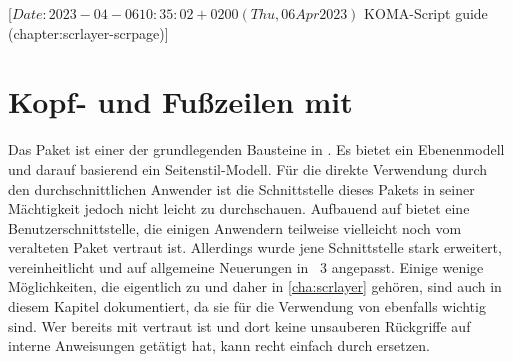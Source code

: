 %
%
%
%
%
%
%

%
                 [$Date: 2023-04-06 10:35:02 +0200 (Thu, 06 Apr 2023) $
                  KOMA-Script guide (chapter:scrlayer-scrpage)]

\chapter[{Kopf- und Fußzeilen mit \Package{scrlayer-scrpage}}]
  {Kopf- und Fußzeilen mit
    }
%
\BeginIndexGroup%
%
Das Paket \hyperref[cha:scrlayer]{}%
%
 ist einer der grundlegenden Bausteine in
\KOMAScript{}. Es bietet ein Ebenenmodell und darauf basierend ein
Seitenstil-Modell. Für die direkte Verwendung durch den durchschnittlichen
Anwender ist die Schnittstelle dieses Pakets in seiner Mächtigkeit jedoch
nicht leicht zu durchschauen.  Aufbauend auf
\hyperref[cha:scrlayer]{} bietet
 eine
Benutzerschnittstelle, die einigen Anwendern teilweise vielleicht noch vom
veralteten Paket
vertraut ist. Allerdings wurde jene Schnittstelle stark erweitert,
vereinheitlicht und auf allgemeine Neuerungen in \KOMAScript~3 angepasst.
Einige wenige Möglichkeiten, die eigentlich zu
\hyperref[cha:scrlayer]{} und daher in
\autoref{cha:scrlayer} gehören, sind auch in diesem Kapitel dokumentiert, da
sie für die Verwendung von  ebenfalls wichtig
sind. Wer bereits mit  vertraut ist und dort keine
unsauberen Rückgriffe auf interne Anweisungen getätigt hat, kann %
\iffalse in der Regel \fi%
 recht einfach durch  ersetzen.

